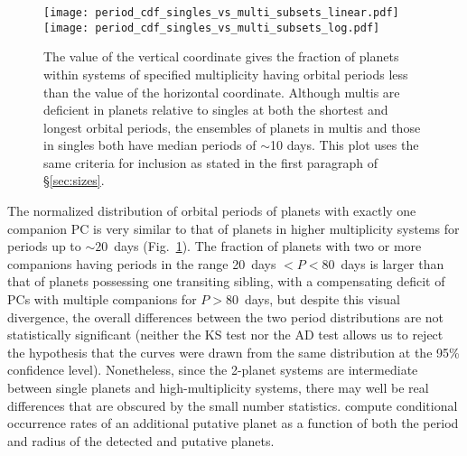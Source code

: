 \documentclass{aastex62}
\begin{document}
\begin{figure}
\centering
\texttt{[image: period\_cdf\_singles\_vs\_multi\_subsets\_linear.pdf]}
    \texttt{[image: period\_cdf\_singles\_vs\_multi\_subsets\_log.pdf]}
\caption{The value of the vertical coordinate gives the fraction of planets within systems of specified multiplicity  having orbital periods less than the value of the horizontal coordinate. %
Although multis are deficient in planets relative to singles at both the shortest and longest orbital periods, the ensembles of planets in multis and those in singles both have median periods of $\sim$10 days. This plot uses the same criteria for inclusion as stated in the first paragraph of \S\ref{sec:sizes}. %
}%
\label{fig:period_multiplicities_split}
\end{figure}

The normalized distribution of orbital periods of planets with exactly one companion PC is very similar to that of planets in higher multiplicity systems for periods up to $\sim 20$~days (Fig.~\ref{fig:period_multiplicities_split}). The  fraction of planets with two or more companions having periods in the range 20~days $< P < 80$~days is larger than that of planets possessing one transiting sibling, with a compensating deficit of PCs with multiple companions for $P > 80$~days, but despite this visual divergence, the overall differences between the two period distributions are not statistically significant (neither the KS test nor the AD test allows us to reject the hypothesis that the curves were drawn from the same distribution at the 95\% confidence level). Nonetheless, since the 2-planet systems are intermediate between single planets and high-multiplicity systems, there may well be real differences that are obscured by the small number statistics. \cite{He:2021} compute conditional occurrence rates of an additional putative planet as a function of both the period and radius of the detected and putative planets.
\end{document}
